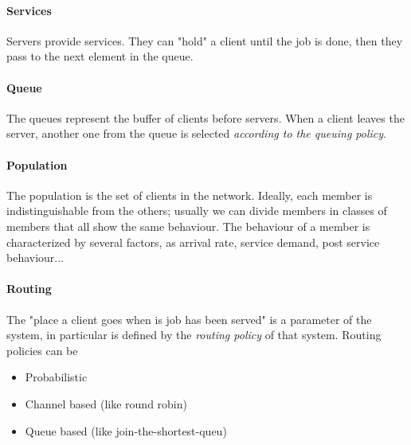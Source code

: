 \documentclass{article}
\begin{document}
					\paragraph{Services}
						Servers provide services. They can "hold" a client until the job is done, then they pass to the next element in the queue.
						
					\paragraph{Queue}
						The queues represent the buffer of clients before servers. When a client leaves the server, another one from the queue is selected \emph{according to the queuing policy}.
						
					\paragraph{Population}
						The population is the set of clients in the network. Ideally, each member is indistinguishable from the others; usually we can divide members in classes of members that all show the same behaviour. The behaviour of a member is characterized by several factors, as arrival rate, service demand, post service behaviour...
						
					\paragraph{Routing}
						The "place a client goes when is job has been served" is a parameter of the system, in particular is defined by the \emph{routing policy} of that system. Routing policies can be
						\begin{itemize}
							\item Probabilistic
							\item Channel based (like round robin)
							\item Queue based (like join-the-shortest-queu)
						\end{itemize}
			
\end{document}

